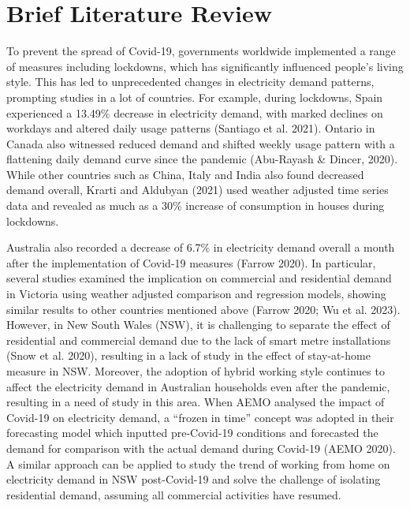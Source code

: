 \documentclass[mstat,12pt]{unswthesis}
\begin{document}
\hypertarget{brief-literature-review}{%
\section{Brief Literature Review}\label{brief-literature-review}}

To prevent the spread of Covid-19, governments worldwide implemented a range of measures including lockdowns, which has significantly influenced people’s living style. This has led to unprecedented changes in electricity demand patterns, prompting studies in a lot of countries. For example, during lockdowns, Spain experienced a 13.49\% decrease in electricity demand, with marked declines on workdays and altered daily usage patterns (Santiago et al. 2021). Ontario in Canada also witnessed reduced demand and shifted weekly usage pattern with a flattening daily demand curve since the pandemic (Abu-Rayash \& Dincer, 2020). While other countries such as China, Italy and India also found decreased demand overall, Krarti and Aldubyan (2021) used weather adjusted time series data and revealed as much as a 30\% increase of consumption in houses during lockdowns. 

\bigskip

Australia also recorded a decrease of 6.7\% in electricity demand overall a month after the implementation of Covid-19 measures (Farrow 2020). In particular, several studies examined the implication on commercial and residential demand in Victoria using weather adjusted comparison and regression models, showing similar results to other countries mentioned above (Farrow 2020; Wu et al. 2023). However, in New South Wales (NSW), it is challenging to separate the effect of residential and commercial demand due to the lack of smart metre installations (Snow et al. 2020), resulting in a lack of study in the effect of stay-at-home measure in NSW. Moreover, the adoption of hybrid working style continues to affect the electricity demand in Australian households even after the pandemic, resulting in a need of study in this area. When AEMO analysed the impact of Covid-19 on electricity demand, a “frozen in time” concept was adopted in their forecasting model which inputted pre-Covid-19 conditions and forecasted the demand for comparison with the actual demand during Covid-19 (AEMO 2020). A similar approach can be applied to study the trend of working from home on electricity demand in NSW post-Covid-19 and solve the challenge of isolating residential demand, assuming all commercial activities have resumed. 
\end{document}
